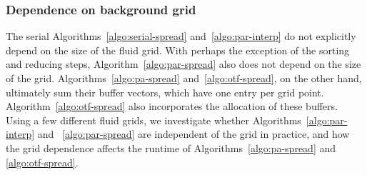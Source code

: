 \subsubsection{Dependence on background grid}\label{sec:grid-dependence}

The serial Algorithms~\ref{algo:serial-spread} and~\ref{algo:par-interp} do not
explicitly depend on the size of the fluid grid. With perhaps the exception of the
sorting and reducing steps, Algorithm~\ref{algo:par-spread} also does not depend on the
size of the grid. Algorithms~\ref{algo:pa-spread} and~\ref{algo:otf-spread}, on the other
hand, ultimately sum their buffer vectors, which have one entry per grid point.
Algorithm~\ref{algo:otf-spread} also incorporates the allocation of these buffers. Using
a few different fluid grids, we investigate whether Algorithms~\ref{algo:par-interp} and%
~\ref{algo:par-spread} are independent of the grid in practice, and how the grid
dependence affects the runtime of Algorithms~\ref{algo:pa-spread} and~%
\ref{algo:otf-spread}.
%

